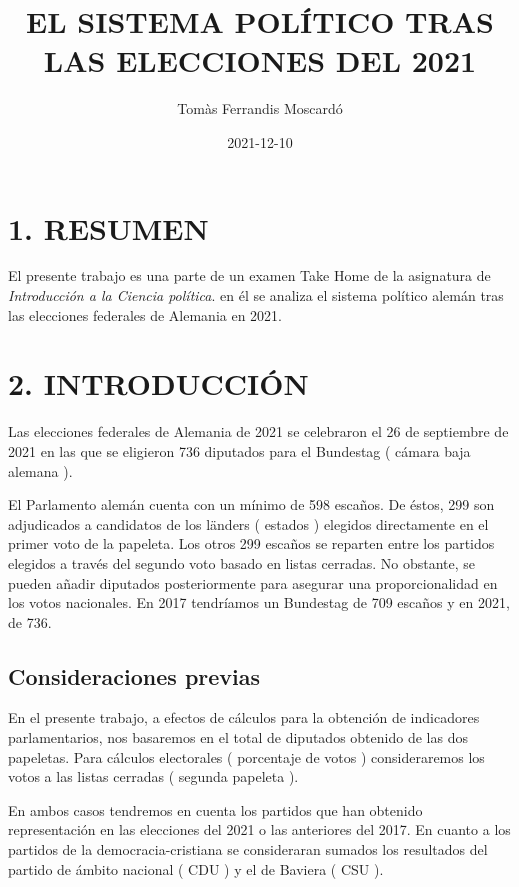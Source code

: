 \documentclass[
]{article}
\title{EL SISTEMA POLÍTICO TRAS LAS ELECCIONES DEL 2021}
\author{Tomàs Ferrandis Moscardó}
\date{2021-12-10}
\begin{document}
\maketitle

{
\setcounter{tocdepth}{2}
\tableofcontents
}
\hypertarget{resumen}{%
\section{1. RESUMEN}\label{resumen}}

El presente trabajo es una parte de un examen Take Home de la asignatura
de \emph{Introducción a la Ciencia política}. en él se analiza el
sistema político alemán tras las elecciones federales de Alemania en
2021.

\hypertarget{introducciuxf3n}{%
\section{2. INTRODUCCIÓN}\label{introducciuxf3n}}

Las elecciones federales de Alemania de 2021 se celebraron el 26 de
septiembre de 2021 en las que se eligieron 736 diputados para el
Bundestag ( cámara baja alemana ).

El Parlamento alemán cuenta con un mínimo de 598 escaños. De éstos, 299
son adjudicados a candidatos de los länders ( estados ) elegidos
directamente en el primer voto de la papeleta. Los otros 299 escaños se
reparten entre los partidos elegidos a través del segundo voto basado en
listas cerradas. No obstante, se pueden añadir diputados posteriormente
para asegurar una proporcionalidad en los votos nacionales. En 2017
tendríamos un Bundestag de 709 escaños y en 2021, de 736.

\hypertarget{consideraciones-previas}{%
\subsection{Consideraciones previas}\label{consideraciones-previas}}

En el presente trabajo, a efectos de cálculos para la obtención de
indicadores parlamentarios, nos basaremos en el total de diputados
obtenido de las dos papeletas. Para cálculos electorales ( porcentaje de
votos ) consideraremos los votos a las listas cerradas ( segunda
papeleta ).

En ambos casos tendremos en cuenta los partidos que han obtenido
representación en las elecciones del 2021 o las anteriores del 2017. En
cuanto a los partidos de la democracia-cristiana se consideraran sumados
los resultados del partido de ámbito nacional ( CDU ) y el de Baviera (
CSU ).
\end{document}
